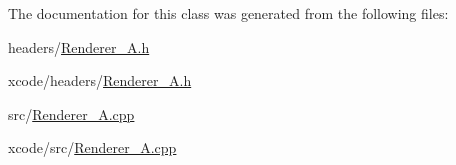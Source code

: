 The documentation for this class was generated from the following files\-:\begin{DoxyCompactItemize}
\item 
headers/\hyperlink{headers_2_renderer___a_8h}{Renderer\-\_\-\-A.\-h}\item 
xcode/headers/\hyperlink{xcode_2headers_2_renderer___a_8h}{Renderer\-\_\-\-A.\-h}\item 
src/\hyperlink{src_2_renderer___a_8cpp}{Renderer\-\_\-\-A.\-cpp}\item 
xcode/src/\hyperlink{xcode_2src_2_renderer___a_8cpp}{Renderer\-\_\-\-A.\-cpp}\end{DoxyCompactItemize}
